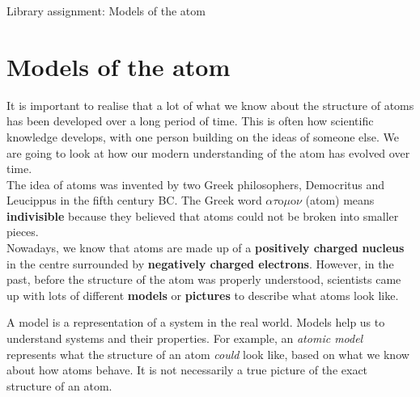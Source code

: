 \begin{project}{Library assignment: Models of the atom}
\begin{minipage}{.4\textwidth}
\end{minipage}

\end{project}
\par \label{m38756*cid2}
            \section{Models of the atom}
            \nopagebreak
      \label{m38756*id254164}It is important to realise that a lot of what we know about the structure of atoms has been developed over a long period of time. This is often how scientific knowledge develops, with one person building on the ideas of someone else. We are going to look at how our modern understanding of the atom has evolved over time.\\ 
      \label{m38756*id254508}The idea of atoms was invented by two Greek philosophers, Democritus and Leucippus in the fifth century BC. The Greek word $\alpha \tau \text{o}\mu \text{o}\nu$ (atom) means \textbf{indivisible} because they believed that atoms could not be broken into smaller pieces.\\ 
      \label{m38756*id254540}Nowadays, we know that atoms are made up of a \textbf{positively charged nucleus} in the centre
surrounded by \textbf{negatively charged electrons}. However, in the past, before the structure of the atom was properly understood, scientists came up with lots of different \textbf{models} or \textbf{pictures} to describe what atoms look like. 

 { A model is a representation of a system in the real world. Models help us to understand systems and their properties. For example, an \textsl{atomic model} represents what the structure of an atom \textsl{could} look like, based on what we know about how atoms behave. It is not necessarily a true picture of the exact structure of an atom. } 
